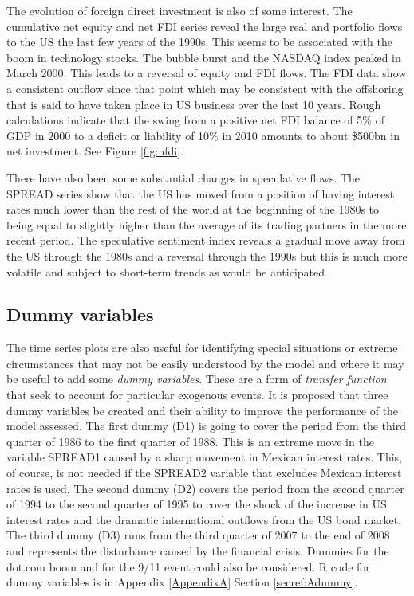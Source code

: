 \documentclass[12pt, a4paper, oneside]{article}\usepackage[]{graphicx}\usepackage[]{color}
\begin{document}
The evolution of foreign direct investment is also of some interest.  The cumulative net equity and net FDI series reveal the large real and portfolio flows to the US the last few years of the 1990s.  This seems to be associated with the boom in technology stocks.  The bubble burst and the NASDAQ index peaked in March 2000.   This leads to a reversal of equity and FDI flows.   The FDI data show a consistent outflow since that point which may be consistent with the offshoring that is said to have taken place in US business over the last 10 years.  Rough calculations indicate that the swing from a positive net FDI balance of 5\% of GDP in 2000 to a deficit or liability of 10\% in 2010  amounts to about \$500bn in net investment.  See Figure \ref{fig:nfdi}.

There have also been some substantial changes in speculative flows.  The SPREAD series show that the US has moved from a position of having interest rates much lower than the rest of the world at the beginning of the 1980s to being equal to slightly higher than the average of its trading partners in the more recent period.  The speculative sentiment index reveals a gradual move away from the US through the 1980s and a reversal through the 1990s but this is much more volatile and subject to short-term trends as would be anticipated.  
\subsection{Dummy variables}\label{secref:dummy}
The time series plots are also useful for identifying special situations or extreme circumstances that may not be easily understood by the model and where it may be useful to add some \emph{dummy variables}.  These are a form of \emph{transfer function} that seek to account for particular exogenous events.  It is proposed that three dummy variables be created and their ability to improve the performance of the model assessed.  The first dummy (D1) is going to cover the period from the third quarter of 1986 to the first quarter of 1988.  This is an extreme move in the variable SPREAD1 caused by a sharp movement in Mexican interest rates. This, of course, is not needed if the SPREAD2 variable that excludes Mexican interest rates is used.  The second dummy (D2) covers the period from the second quarter of 1994 to the second quarter of 1995 to cover the shock of the increase in US interest rates and the dramatic international outflows from the US bond market.   The third dummy (D3) runs from the third quarter of 2007 to the end of 2008 and represents the disturbance caused by the financial crisis. Dummies for the dot.com boom and for the 9/11 event could also be considered.  R code for dummy variables is in Appendix \ref{AppendixA} Section \ref{secref:Adummy}. 
\end{document}
